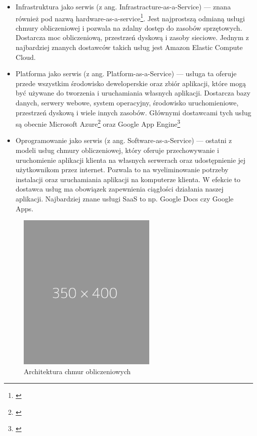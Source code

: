 \documentclass[12pt]{report}
\begin{document}
\begin{itemize}
\item Infrastruktura jako serwis (z ang. Infrastracture-as-a-Service) --- znana również pod nazwą hardware-as-a-service\footnote{\cite{haas}}. Jest najprostszą odmianą usługi chmu\-ry obliczeniowej i pozwala na zdalny dostęp do zasobów sprzętowych. Dostarcza moc obliczeniową, przestrzeń dyskową i zasoby sieciowe. Jednym z najbardziej znanych dostawców takich usług jest Amazon Elastic Compute Cloud.
\item Platforma jako serwis (z ang. Platform-as-a-Service) --- usługa ta oferuje przede wszystkim środowisko deweloperskie oraz zbiór aplikacji, które mogą być używane do tworzenia i uruchamiania własnych aplikacji. Dostarcza bazy danych, serwery webowe, system operacyjny, środowisko uruchomieniowe, przestrzeń dyskową i wiele innych zasobów. Głównymi dostawcami tych usług są obecnie Microsoft Azure\footnote{\cite{azure}} oraz Google App Engine\footnote{\cite{gae}}
\item Oprogramowanie jako serwis (z ang. Software-as-a-Service) --- ostatni z modeli usług chmury obliczeniowej, który oferuje przechowywanie i uruchomienie aplikacji klienta na własnych serwerach oraz udostępnienie jej użytkownikom przez internet. Pozwala to na wyeliminowanie potrzeby instalacji oraz uruchamiania aplikacji na komputerze klienta. W efekcie to dostawca usług ma obowiązek zapewnienia ciągłości działania naszej aplikacji. Najbardziej znane usługi SaaS to np. Google Docs czy Google Apps.
\end{itemize}

\begin{figure}[h]
	\centering
	\includegraphics[width=0.6\textwidth]{images/placeholder.png}
	\caption{Architektura chmur obliczeniowych}
\end{figure}
\end{document}
